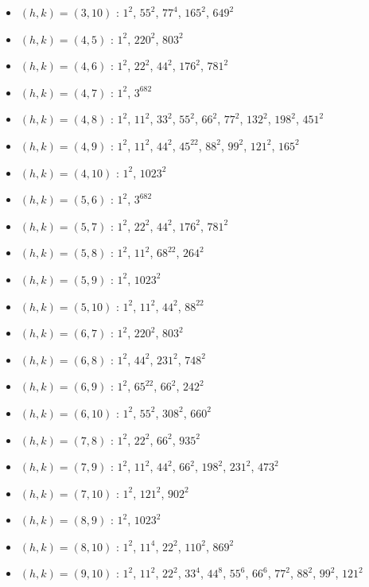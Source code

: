 \begin{itemize}
\item $(h,k)=(3,10)$ : $1^{2}$, $55^{2}$, $77^{4}$, $165^{2}$, $649^{2}$
\item $(h,k)=(4,5)$ : $1^{2}$, $220^{2}$, $803^{2}$
\item $(h,k)=(4,6)$ : $1^{2}$, $22^{2}$, $44^{2}$, $176^{2}$, $781^{2}$
\item $(h,k)=(4,7)$ : $1^{2}$, $3^{682}$
\item $(h,k)=(4,8)$ : $1^{2}$, $11^{2}$, $33^{2}$, $55^{2}$, $66^{2}$, $77^{2}$, $132^{2}$, $198^{2}$, $451^{2}$
\item $(h,k)=(4,9)$ : $1^{2}$, $11^{2}$, $44^{2}$, $45^{22}$, $88^{2}$, $99^{2}$, $121^{2}$, $165^{2}$
\item $(h,k)=(4,10)$ : $1^{2}$, $1023^{2}$
\item $(h,k)=(5,6)$ : $1^{2}$, $3^{682}$
\item $(h,k)=(5,7)$ : $1^{2}$, $22^{2}$, $44^{2}$, $176^{2}$, $781^{2}$
\item $(h,k)=(5,8)$ : $1^{2}$, $11^{2}$, $68^{22}$, $264^{2}$
\item $(h,k)=(5,9)$ : $1^{2}$, $1023^{2}$
\item $(h,k)=(5,10)$ : $1^{2}$, $11^{2}$, $44^{2}$, $88^{22}$
\item $(h,k)=(6,7)$ : $1^{2}$, $220^{2}$, $803^{2}$
\item $(h,k)=(6,8)$ : $1^{2}$, $44^{2}$, $231^{2}$, $748^{2}$
\item $(h,k)=(6,9)$ : $1^{2}$, $65^{22}$, $66^{2}$, $242^{2}$
\item $(h,k)=(6,10)$ : $1^{2}$, $55^{2}$, $308^{2}$, $660^{2}$
\item $(h,k)=(7,8)$ : $1^{2}$, $22^{2}$, $66^{2}$, $935^{2}$
\item $(h,k)=(7,9)$ : $1^{2}$, $11^{2}$, $44^{2}$, $66^{2}$, $198^{2}$, $231^{2}$, $473^{2}$
\item $(h,k)=(7,10)$ : $1^{2}$, $121^{2}$, $902^{2}$
\item $(h,k)=(8,9)$ : $1^{2}$, $1023^{2}$
\item $(h,k)=(8,10)$ : $1^{2}$, $11^{4}$, $22^{2}$, $110^{2}$, $869^{2}$
\item $(h,k)=(9,10)$ : $1^{2}$, $11^{2}$, $22^{2}$, $33^{4}$, $44^{8}$, $55^{6}$, $66^{6}$, $77^{2}$, $88^{2}$, $99^{2}$, $121^{2}$
\end{itemize}
